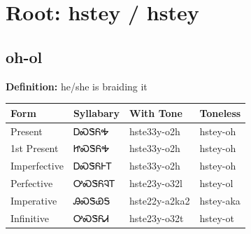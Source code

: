 \documentclass{article}%
\begin{document}
%
\normalsize%
\section*{Root: hstey / hstey}%
\subsection*{oh-ol}%
\textbf{Definition: }%
he/she is braiding it%
\\[0.5em]%
\begin{tabular}{|l|l|l|l|}%
\hline%
\textbf{Form}&\textbf{Syllabary}&\textbf{With Tone}&\textbf{Toneless}\\%
\hline%
Present&ᎠᏍᏕᏲᎭ&hste33y{-}o2h&hstey{-}oh\\%
1st Present&ᏥᏍᏕᏲᎭ&hste33y{-}o2h&hstey{-}oh\\%
Imperfective&ᎠᏍᏕᏲᎰᎢ&hste33y{-}o2h&hstey{-}oh\\%
Perfective&ᎤᏍᏕᏲᎸᎢ&hste23y{-}o32l&hstey{-}ol\\%
Imperative&ᎯᏍᏕᏯᎦ&hste22y{-}a2ka2&hstey{-}aka\\%
Infinitive&ᎤᏍᏕᏲᏗ&hste23y{-}o32t&hstey{-}ot\\%
\hline%
\end{tabular}%
\\[1em]%
\end{document}
